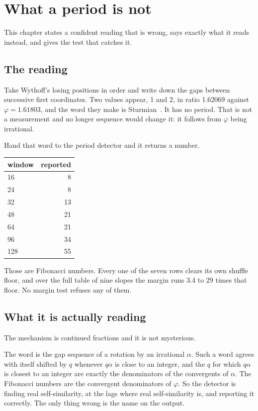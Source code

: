 \chapter{What a period is not}

This chapter states a confident reading that is wrong, says exactly what it reads instead, and
gives the test that catches it.

\section{The reading}

Take Wythoff's losing positions in order and write down the gaps between successive first
coordinates. Two values appear, 1 and 2, in ratio 1.62069 against \(\varphi = 1.61803\), and the word
they make is Sturmian~\cite{src:Lothaire-2002}. It has no period. That is not a measurement and no longer sequence would
change it: it follows from \(\varphi\) being irrational.

Hand that word to the period detector and it returns a number.

\begin{center}
\begin{tabular}{@{}lr@{}}
\toprule
window & reported \\
\midrule
16 & 8 \\
24 & 8 \\
32 & 13 \\
48 & 21 \\
64 & 21 \\
96 & 34 \\
128 & 55 \\
\bottomrule
\end{tabular}
\end{center}

Those are Fibonacci numbers. Every one of the seven rows clears its own shuffle floor, and over the
full table of nine slopes the margin runs 3.4 to 29 times that floor. No margin test refuses any of
them.

\section{What it is actually reading}

The mechanism is continued fractions and it is not mysterious.

The word is the gap sequence of a rotation by an irrational \(\alpha\). Such a word agrees with
itself shifted by \(q\) whenever \(q\alpha\) is close to an integer, and the \(q\) for which
\(q\alpha\) is closest to an integer are exactly the denominators of the convergents of \(\alpha\).
The Fibonacci numbers are the convergent denominators of \(\varphi\). So the detector is finding
real self-similarity, at the lags where real self-similarity is, and reporting it correctly. The
only thing wrong is the name on the output.

